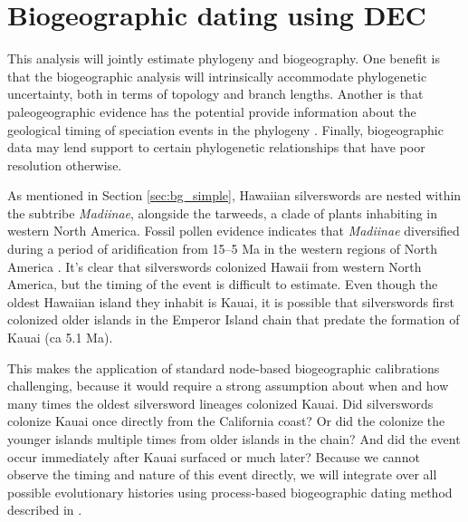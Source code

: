 

\section{Biogeographic dating using DEC} \label{sec:bg_phylo}

This analysis will jointly estimate phylogeny and biogeography.
One benefit is that the biogeographic analysis will intrinsically accommodate phylogenetic uncertainty, both in terms of topology and branch lengths.
Another is that paleogeographic evidence has the potential provide information about the geological timing of speciation events in the phylogeny \citep{Ho2015}.
Finally, biogeographic data may lend support to certain phylogenetic relationships that have poor resolution otherwise.

As mentioned in Section \ref{sec:bg_simple}, Hawaiian silverswords are nested within the subtribe {\it Madiinae}, alongside the tarweeds, a clade of plants inhabiting in western North America.
Fossil pollen evidence indicates that {\it Madiinae} diversified during a period of aridification from 15--5 Ma in the western regions of North America \citep{Baldwin1991}.
It's clear that silverswords colonized Hawaii from western North America, but the timing of the event is difficult to estimate.
Even though the oldest Hawaiian island they inhabit is Kauai, it is possible that silverswords first colonized older islands in the Emperor Island chain that predate the formation of Kauai (ca 5.1 Ma).

This makes the application of standard node-based biogeographic calibrations challenging, because it would require a strong assumption about when and how many times the oldest silversword lineages colonized Kauai.
Did silverswords colonize Kauai once directly from the California coast? Or did the colonize the younger islands multiple times from older islands in the chain? And did the event occur immediately after Kauai surfaced or much later? Because we cannot observe the timing and nature of this event directly, we will integrate over all possible evolutionary histories using process-based biogeographic dating method described in \citet{Landis2016}.

